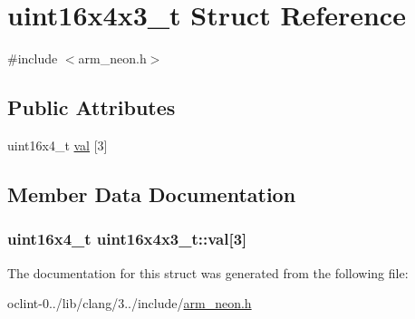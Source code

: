 \hypertarget{structuint16x4x3__t}{\section{uint16x4x3\-\_\-t Struct Reference}
\label{structuint16x4x3__t}
}


{\ttfamily \#include $<$arm\-\_\-neon.\-h$>$}

\subsection*{Public Attributes}
\begin{DoxyCompactItemize}
\item 
uint16x4\-\_\-t \hyperlink{structuint16x4x3__t_a8c54405dc456c34462ef61e2adf32dd5}{val} \mbox{[}3\mbox{]}
\end{DoxyCompactItemize}


\subsection{Member Data Documentation}
\hypertarget{structuint16x4x3__t_a8c54405dc456c34462ef61e2adf32dd5}{
\subsubsection[{val}]{\setlength{\rightskip}{0pt plus 5cm}uint16x4\-\_\-t uint16x4x3\-\_\-t\-::val\mbox{[}3\mbox{]}}}\label{structuint16x4x3__t_a8c54405dc456c34462ef61e2adf32dd5}


The documentation for this struct was generated from the following file\-:\begin{DoxyCompactItemize}
\item 
oclint-\/0../lib/clang/3../include/\hyperlink{arm__neon_8h}{arm\-\_\-neon.\-h}\end{DoxyCompactItemize}
